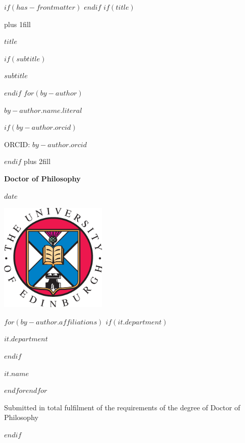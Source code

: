 $if(has-frontmatter)$
\frontmatter
$endif$
$if(title)$
\cleardoublepage
\thispagestyle{empty}
{\centering
\hbox{}\vskip 0cm plus 1fill
{\Huge\bfseries $title$ \par}
$if(subtitle)$
\vspace{3ex}
{\large\bfseries $subtitle$ \par}
$endif$
\vspace{10ex}
$for(by-author)$
{\Large\bfseries $by-author.name.literal$ \par}
$if(by-author.orcid)$
{\large ORCID: $by-author.orcid$ \par}
$endif$
\vskip 0cm plus 2fill
{\bfseries\large Doctor of Philosophy \par}
\vspace{3ex}
{\bfseries\large $date$ \par}
\vspace{5ex}

\centering%
\includegraphics[width=2in]{EdUniCrest.eps}\par%
\vspace{5ex}

$for(by-author.affiliations)$%
$if(it.department)$%
{\bfseries\large $it.department$ \par}
\vspace{3ex}
$endif$%
{\bfseries\large $it.name$ \par}
$endfor$$endfor$%
\vspace{10ex}
{\small Submitted in total fulfilment of the requirements
of the degree of Doctor of Philosophy \par}
}
$endif$